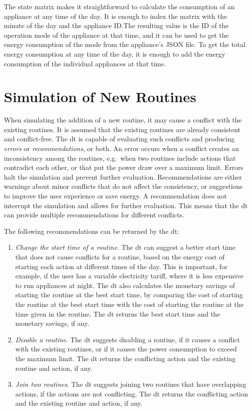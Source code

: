 The state matrix makes it straightforward to calculate the consumption of an appliance at any time of the day. It is enough to index the matrix with the minute of the day and the appliance ID.\@ The resulting value is the ID of the operation mode of the appliance at that time, and it can be used to get the energy consumption of the mode from the appliance's JSON file. To get the total energy consumption at any time of the day, it is enough to add the energy consumption of the individual appliances at that time.

\section{Simulation of New Routines}\label{sec:simulation}

When simulating the addition of a new routine, it may cause a conflict with the existing routines. It is assumed that the existing routines are already consistent and conflict-free. The \acrshort{dt} is capable of evaluating such conflicts and producing \textit{errors} or \textit{recommendations}, or both. An error occurs when a conflict creates an inconsistency among the routines, e.g.\ when two routines include actions that contradict each other, or that put the power draw over a maximum limit. Errors halt the simulation and prevent further evaluation. Recommendations are either warnings about minor conflicts that do not affect the consistency, or suggestions to improve the user experience or save energy. A recommendation does not interrupt the simulation and allows for further evaluation. This means that the \acrshort{dt} can provide multiple recommendations for different conflicts.

The following recommendations can be returned by the \acrshort{dt}:
\begin{enumerate}[label={R\arabic*.}, leftmargin=3.5em]
    \item \textit{Change the start time of a routine}. The \acrshort{dt} can suggest a better start time that does not cause conflicts for a routine, based on the energy cost of starting each action at different times of the day. This is important, for example, if the user has a variable electricity tariff, where it is less expensive to run appliances at night. The \acrshort{dt} also calculates the monetary savings of starting the routine at the best start time, by comparing the cost of starting the routine at the best start time with the cost of starting the routine at the time given in the routine. The \acrshort{dt} returns the best start time and the monetary savings, if any.
    \item \textit{Disable a routine}. The \acrshort{dt} suggests disabling a routine, if it causes a conflict with the existing routines, or if it causes the power consumption to exceed the maximum limit. The \acrshort{dt} returns the conflicting action and the existing routine and action, if any.
    \item \textit{Join two routines}. The \acrshort{dt} suggests joining two routines that have overlapping actions, if the actions are not conflicting. The \acrshort{dt} returns the conflicting action and the existing routine and action, if any.
\end{enumerate}

